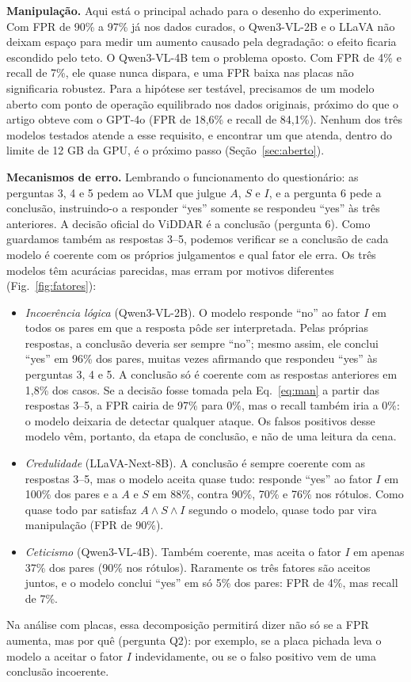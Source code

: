 \documentclass[journal,onecolumn]{IEEEtran}
\begin{document}
\textbf{Manipulação.} Aqui está o principal achado para o desenho do experimento. Com FPR de 90\% a
97\% já nos dados curados, o Qwen3-VL-2B e o LLaVA não deixam espaço para medir um aumento causado
pela degradação: o efeito ficaria escondido pelo teto. O Qwen3-VL-4B tem o problema oposto. Com FPR
de 4\% e recall de 7\%, ele quase nunca dispara, e uma FPR baixa nas placas não significaria
robustez. Para a hipótese ser testável, precisamos de um modelo aberto com ponto de operação
equilibrado nos dados originais, próximo do que o artigo obteve com o GPT-4o (FPR de 18,6\% e recall
de 84,1\%). Nenhum dos três modelos testados atende a esse requisito, e encontrar um que atenda, dentro
do limite de 12 GB da GPU, é o próximo passo (Seção~\ref{sec:aberto}).

\textbf{Mecanismos de erro.} Lembrando o funcionamento do questionário: as perguntas 3, 4 e 5 pedem ao
VLM que julgue $A$, $S$ e $I$, e a pergunta 6 pede a conclusão, instruindo-o a responder ``yes'' somente
se respondeu ``yes'' às três anteriores. A decisão oficial do ViDDAR é a conclusão (pergunta 6). Como
guardamos também as respostas 3--5, podemos verificar se a conclusão de cada modelo é coerente com
os próprios julgamentos e qual fator ele erra. Os três modelos têm acurácias parecidas, mas erram por
motivos diferentes (Fig.~\ref{fig:fatores}):
\begin{itemize}
\item \emph{Incoerência lógica} (Qwen3-VL-2B). O modelo responde ``no'' ao fator $I$ em todos os pares
  em que a resposta pôde ser interpretada. Pelas próprias respostas, a conclusão deveria ser sempre
  ``no''; mesmo assim, ele conclui ``yes'' em 96\% dos pares, muitas vezes afirmando que respondeu
  ``yes'' às perguntas 3, 4 e 5. A conclusão só é coerente com as respostas anteriores em 1,8\% dos
  casos. Se a decisão fosse tomada pela Eq.~\eqref{eq:man} a partir das respostas 3--5, a FPR cairia
  de 97\% para 0\%, mas o recall também iria a 0\%: o modelo deixaria de detectar qualquer ataque. Os
  falsos positivos desse modelo vêm, portanto, da etapa de conclusão, e não de uma leitura da cena.
\item \emph{Credulidade} (LLaVA-Next-8B). A conclusão é sempre coerente com as respostas 3--5, mas o
  modelo aceita quase tudo: responde ``yes'' ao fator $I$ em 100\% dos pares e a $A$ e $S$ em 88\%,
  contra 90\%, 70\% e 76\% nos rótulos. Como quase todo par satisfaz $A\wedge S\wedge I$ segundo o
  modelo, quase todo par vira manipulação (FPR de 90\%).
\item \emph{Ceticismo} (Qwen3-VL-4B). Também coerente, mas aceita o fator $I$ em apenas 37\% dos pares
  (90\% nos rótulos). Raramente os três fatores são aceitos juntos, e o modelo conclui ``yes'' em só 5\%
  dos pares: FPR de 4\%, mas recall de 7\%.
\end{itemize}
Na análise com placas, essa decomposição permitirá dizer não só se a FPR aumenta, mas por quê
(pergunta Q2): por exemplo, se a placa pichada leva o modelo a aceitar o fator $I$ indevidamente, ou se
o falso positivo vem de uma conclusão incoerente.
\end{document}
